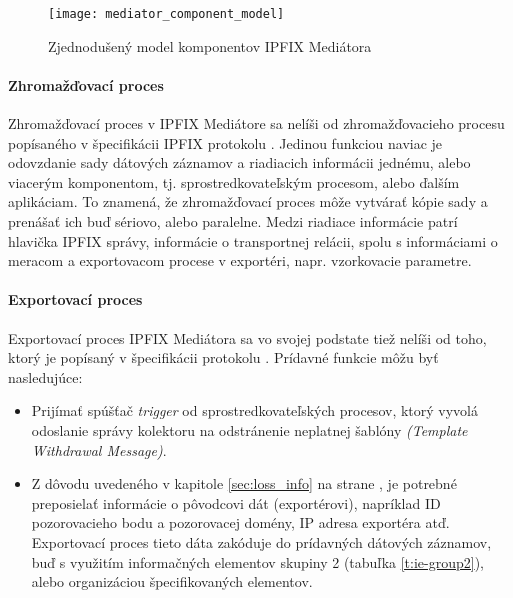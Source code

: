 \begin{figure}[ht!]
\centering
\texttt{[image: mediator\_component\_model]}
\caption{Zjednodušený model komponentov IPFIX Mediátora}\label{o:mediator_component_model}
\end{figure}


\paragraph{Zhromažďovací proces}

Zhromažďovací proces v IPFIX Mediátore sa nelíši od zhromažďovacieho procesu popísaného v 
špecifikácii IPFIX protokolu \citep{rfc5101}.
Jedinou funkciou naviac je odovzdanie sady dátových záznamov a riadiacich informácii jednému, alebo 
viacerým komponentom, tj. sprostredkovateľským procesom, alebo ďalším aplikáciam. 
To znamená, že zhromažďovací proces môže vytvárať kópie sady a prenášať ich buď sériovo, alebo paralelne.  
Medzi riadiace informácie patrí hlavička IPFIX správy, informácie o transportnej relácii, 
spolu s informáciami o meracom a exportovacom procese v exportéri, napr. vzorkovacie parametre.

\paragraph{Exportovací proces} \label{sec:exporting_process}

Exportovací proces IPFIX Mediátora sa vo svojej podstate tiež nelíši od toho, ktorý je popísaný v špecifikácii
protokolu \citep{rfc5101}.
Prídavné funkcie môžu byť nasledujúce:
\begin{itemize}
 \item Prijímať spúšťač \emph{trigger} od sprostredkovateľských procesov, ktorý vyvolá odoslanie správy
 kolektoru na odstránenie neplatnej šablóny \emph{(Template Withdrawal Message)}.
 \item Z dôvodu uvedeného v kapitole \ref{sec:loss_info} na strane \pageref{sec:loss_info}, je potrebné 
 preposielať informácie o pôvodcovi dát (exportérovi), napríklad ID pozorovacieho bodu a pozorovacej 
 domény, IP adresa exportéra atď. Exportovací proces tieto dáta zakóduje do prídavných dátových záznamov, 
 buď s využitím 
 informačných elementov skupiny 2 (tabuľka \ref{t:ie-group2}), alebo organizáciou špecifikovaných 
 elementov.
\end{itemize}

